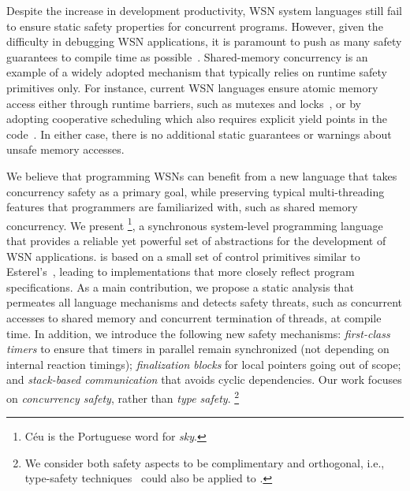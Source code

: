 Despite the increase in development productivity, WSN system languages still 
fail to ensure static safety properties for concurrent programs.
%
However, given the difficulty in debugging WSN applications, it is paramount to 
push as many safety guarantees to compile time as possible~\cite{wsn.decade}.
%
Shared-memory concurrency is an example of a widely adopted mechanism that 
typically relies on runtime safety primitives only.
For instance, current WSN languages ensure atomic memory access either through 
runtime barriers, such as mutexes and 
locks~\cite{wsn.mantisos,wsn.tinythreads}, or by adopting cooperative 
scheduling which also requires explicit yield points in the 
code~\cite{wsn.sol,wsn.protothreads}.
In either case, there is no additional static guarantees or warnings about 
unsafe memory accesses.

We believe that programming WSNs can benefit from a new language that takes 
concurrency safety as a primary goal, while preserving typical multi-threading 
features that programmers are familiarized with, such as shared memory 
concurrency.
%
We present \CEU%
\footnote{C\'eu is the Portuguese word for \emph{sky}.},
a synchronous system-level programming language that provides a reliable yet 
powerful set of abstractions for the development of WSN applications.
%
\CEU is based on a small set of control primitives similar to 
Esterel's~\cite{esterel.ieee91}, leading to implementations that more closely 
reflect program specifications.
%
As a main contribution, we propose a static analysis that permeates all 
language mechanisms and detects safety threats, such as concurrent accesses to 
shared memory and concurrent termination of threads, at compile time.
%
In addition, we introduce the following new safety mechanisms:
\emph{first-class timers} to ensure that timers in parallel remain synchronized 
(not depending on internal reaction timings);
\emph{finalization blocks} for local pointers going out of scope;
and \emph{stack-based communication} that avoids cyclic dependencies.
%
Our work focuses on \emph{concurrency safety}, rather than \emph{type safety}.%
\footnote{
We consider both safety aspects to be complimentary and orthogonal, i.e., 
type-safety techniques~\cite{wsn.safety} could also be applied to \CEU.
}

